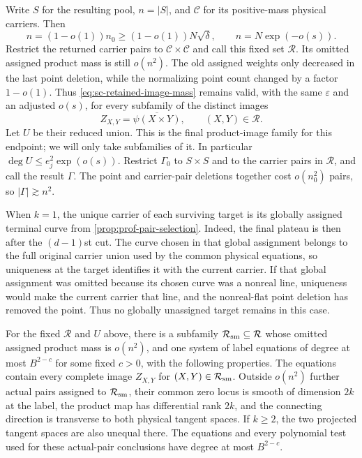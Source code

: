 Write $S$ for the resulting pool, $n=|S|$, and $\mathcal{C}$ for its positive-mass physical carriers.  Then
\begin{equation}\label{eq:sc-outer-retained-pool}
 n=(1-o(1))n_0\ge(1-o(1))N\sqrt\delta,
 \qquad n=N\exp(-o(s)).
\end{equation}
Restrict the returned carrier pairs to $\mathcal{C}\times\mathcal{C}$ and call this fixed set $\mathcal{R}$.  Its omitted assigned product mass is still $o(n^2)$.  The old assigned weights only decreased in the last point deletion, while the normalizing point count changed by a factor $1-o(1)$.  Thus \eqref{eq:sc-retained-image-mass} remains valid, with the same $\varepsilon$ and an adjusted $o(s)$, for every subfamily of the distinct images
\[
 Z_{X,Y}=\overline{\psi(X\times Y)},\qquad (X,Y)\in\mathcal{R}.
\]
Let $U$ be their reduced union.  This is the final product-image family for this endpoint; we will only take subfamilies of it.  In particular $\deg U\le e_j^2\exp(o(s))$.  Restrict $\Gamma_0$ to $S\times S$ and to the carrier pairs in $\mathcal{R}$, and call the result $\Gamma$. The point and carrier-pair deletions together cost $o(n_0^2)$ pairs, so $|\Gamma|\gtrsim n^2$.

When $k=1$, the unique carrier of each surviving target is its globally assigned terminal curve from \cref{prop:prof-pair-selection}. Indeed, the final plateau is then after the $(d-1)$st cut.  The curve chosen in that global assignment belongs to the full original carrier union used by the common physical equations, so uniqueness at the target identifies it with the current carrier.  If that global assignment was omitted because its chosen curve was a nonreal line, uniqueness would make the current carrier that line, and the nonreal-flat point deletion has removed the point.  Thus no globally unassigned target remains in this case.

\begin{lemma}
\label{lem:sc-outer-regularity}
For the fixed $\mathcal{R}$ and $U$ above, there is a subfamily $\mathcal{R}_{\rm sm}\subseteq\mathcal{R}$ whose omitted assigned product mass is $o(n^2)$, and one system of label equations of degree at most $B^{2-c}$ for some fixed $c>0$, with the following properties. The equations contain every complete image $Z_{X,Y}$ for $(X,Y)\in\mathcal{R}_{\rm sm}$.  Outside $o(n^2)$ further actual pairs assigned to $\mathcal{R}_{\rm sm}$, their common zero locus is smooth of dimension $2k$ at the label, the product map has differential rank $2k$, and the connecting direction is transverse to both physical tangent spaces.  If $k\ge2$, the two projected tangent spaces are also unequal there.  The equations and every polynomial test used for these actual-pair conclusions have degree at most $B^{2-c}$.
\end{lemma}

